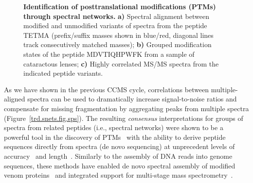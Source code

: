 \documentclass[arial,11pt]{article}
\begin{document}
\begin{figure}[!htb]
\small
\centering

\caption{\footnotesize{\bf Identification of posttranslational modifications (PTMs) through spectral networks.} \textbf{a)} Spectral alignment between modified and unmodified variants of spectra from the peptide TETMA (prefix/suffix masses shown in blue/red, diagonal lines track consecutively matched masses); \textbf{b)} Grouped modification states of the peptide MDVTIQHPWFK from a sample of cataractous lenses; \textbf{c)} Highly correlated MS/MS spectra from the indicated peptide variants.}
\label{trd.snets.fig.spectralNetworks}
\end{figure}
\normalsize

As we have shown in the previous CCMS cycle, %
correlations between multiple-aligned spectra can be used to dramatically increase signal-to-noise ratios and compensate for missing fragmentation by aggregating peaks from multiple spectra (Figure~\ref{trd.snets.fig.sps}). The resulting {\em consensus} interpretations for groups of spectra from related peptides (i.e., spectral networks) were shown to be a powerful tool in the discovery of  PTMs~\cite{bandeira07pnas,gonzalez10,yang11} with the ability to derive peptide sequences directly from  spectra (de novo sequencing) at unprecedent levels of accuracy~\cite{bandeira07mcp,guthals12metasps} and length~\cite{bandeira08,guthals12metasps}. Similarly to the assembly of DNA reads into genome sequences, these methods have enabled de novo spectral assembly of modified venom proteins~\cite{bandeira07mcp} %
and integrated support for multi-stage mass spectrometry~\cite{bandeira08mann}.
\end{document}
